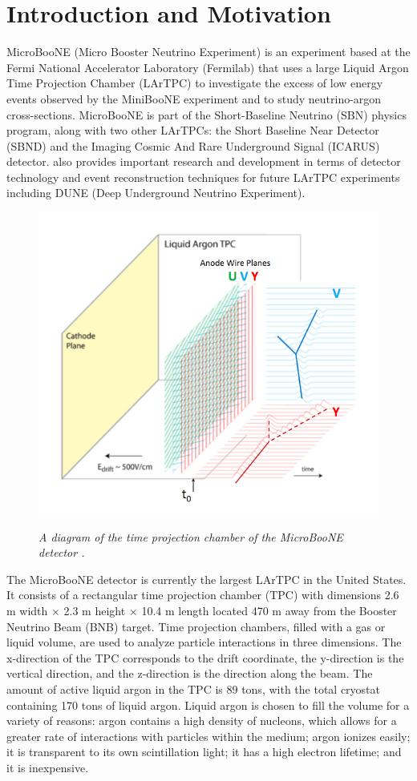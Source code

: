 \section{Introduction and Motivation}

MicroBooNE (Micro Booster Neutrino Experiment) is an experiment based at the Fermi National Accelerator Laboratory (Fermilab) that uses a large Liquid Argon Time Projection Chamber (LArTPC) to investigate the excess of low energy events observed by the MiniBooNE experiment \cite{Aguilar-Arevalo:2013pmq} and to study neutrino-argon cross-sections. MicroBooNE is part of the Short-Baseline Neutrino (SBN) physics program, along with two other LArTPCs: the Short Baseline Near Detector (SBND) and the Imaging Cosmic And Rare Underground Signal (ICARUS) detector. {\ub} also provides important research and development in terms of detector technology and event reconstruction techniques for future LArTPC experiments including DUNE (Deep Underground Neutrino Experiment).\\

\begin{figure}[ht!]
\centering
	\includegraphics[width=0.4\linewidth]{Figures/static_figs/detector2.png} \\
\caption{\textit{A diagram of the time projection chamber of the MicroBooNE detector \cite{lartpc}.}}\label{detector_fig}
\end{figure}

The MicroBooNE detector is currently the largest LArTPC in the United States. It consists of a rectangular time projection chamber (TPC) with dimensions 2.6 m width $\times$ 2.3 m height $\times$ 10.4 m length located 470 m away from the Booster Neutrino Beam (BNB) target. Time projection chambers, filled with a gas or liquid volume, are used to analyze particle interactions in three dimensions. The x-direction of the TPC corresponds to the drift coordinate, the y-direction is the vertical direction, and the z-direction is the direction along the beam. The amount of active liquid argon in the TPC is 89 tons, with the total cryostat containing 170 tons of liquid argon. Liquid argon is chosen to fill the volume for a variety of reasons: argon contains a high density of nucleons, which allows for a greater rate of interactions with particles within the medium; argon ionizes easily; it is transparent to its own scintillation light; it has a high electron lifetime; and it is inexpensive.\\

